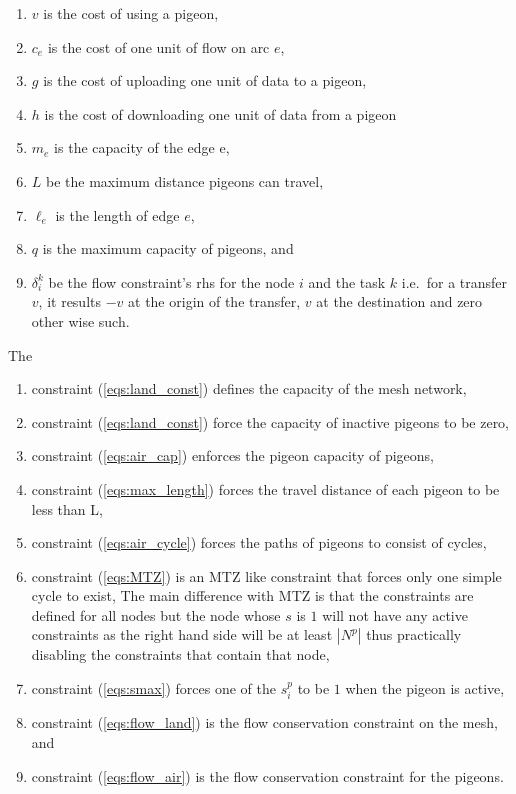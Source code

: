 \documentclass{article}
\begin{document}
    \begin{enumerate}
    \item $v$ is the cost of using a pigeon,
    \item $c_e$ is the cost of one unit of flow on arc $e$,
    \item $g$ is the cost of uploading one unit of data to a pigeon,
    \item $h$ is the cost of downloading one unit of data from a pigeon
    \item $m_e$ is the capacity of the edge e,

    \item $L$ be the maximum distance pigeons can travel,
    \item $\ell_e$ is the length of edge $e$,
    \item $q$ is the maximum capacity of pigeons, and
    \item $\delta^k_{i}$ be the flow constraint's rhs for the node $i$ and the task $k$ i.e.\ for a transfer $v$, it results $-v$ at the origin of the transfer, $v$ at the destination and zero other wise such.
    \end{enumerate}
    The
    \begin{enumerate}
        \item constraint (\ref{eqs:land_const}) defines the capacity of the mesh network,
        \item constraint (\ref{eqs:land_const}) force the capacity of inactive pigeons to be zero,
        \item constraint (\ref{eqs:air_cap}) enforces the pigeon capacity of pigeons,
        \item constraint (\ref{eqs:max_length}) forces the travel distance of each pigeon to be less than L,
        \item constraint (\ref{eqs:air_cycle}) forces the paths of pigeons to consist of cycles,
        \item constraint (\ref{eqs:MTZ}) is an MTZ like constraint that forces only one simple cycle to exist, The main difference with MTZ is that the constraints are defined for all nodes but the node whose $s$ is $1$ will not have any active constraints as the right hand side will be at least $|N^p|$ thus practically disabling the constraints that contain that node,
        \item constraint (\ref{eqs:smax}) forces one of the $s^p_i$ to be $1$ when the pigeon is active,
        \item constraint (\ref{eqs:flow_land}) is the flow conservation constraint on the mesh, and
        \item constraint (\ref{eqs:flow_air}) is the flow conservation constraint for the pigeons.
    \end{enumerate}
\end{document}
